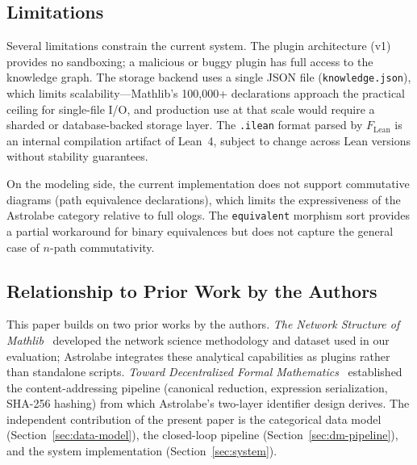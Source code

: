 \subsection{Limitations}
\label{sec:disc-limitations}

Several limitations constrain the current system. The plugin architecture (v1) provides no sandboxing; a malicious or buggy plugin has full access to the knowledge graph. The storage backend uses a single JSON file (\texttt{knowledge.json}), which limits scalability---Mathlib's 100{,}000+ declarations approach the practical ceiling for single-file I/O, and production use at that scale would require a sharded or database-backed storage layer. The \texttt{.ilean} format parsed by $F_{\mathrm{Lean}}$ is an internal compilation artifact of Lean~4, subject to change across Lean versions without stability guarantees.

On the modeling side, the current implementation does not support commutative diagrams (path equivalence declarations), which limits the expressiveness of the Astrolabe category relative to full ologs. The \texttt{equivalent} morphism sort provides a partial workaround for binary equivalences but does not capture the general case of $n$-path commutativity.


\subsection{Relationship to Prior Work by the Authors}
\label{sec:disc-prior-work}

This paper builds on two prior works by the authors. \emph{The Network Structure of Mathlib}~\cite{LiPengSeverini2026} developed the network science methodology and dataset used in our evaluation; Astrolabe integrates these analytical capabilities as plugins rather than standalone scripts. \emph{Toward Decentralized Formal Mathematics}~\cite{LiParisSeverini2026} established the content-addressing pipeline (canonical reduction, expression serialization, SHA-256 hashing) from which Astrolabe's two-layer identifier design derives. The independent contribution of the present paper is the categorical data model (Section~\ref{sec:data-model}), the closed-loop pipeline (Section~\ref{sec:dm-pipeline}), and the system implementation (Section~\ref{sec:system}).
